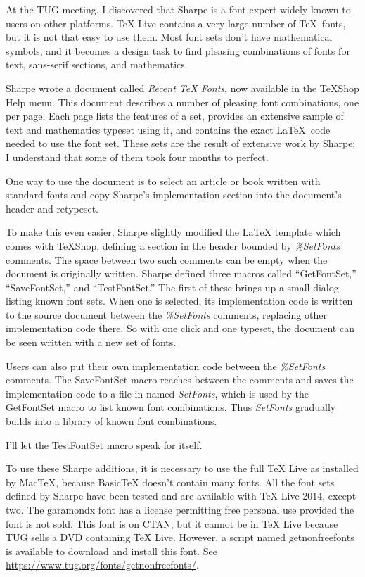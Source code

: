 \documentclass[11pt, oneside]{amsart}
\begin{document}
At the TUG meeting, I discovered that Sharpe is a font expert widely known to users on other platforms.
TeX Live contains a very large number of \TeX\ fonts, but it is not that easy to use them.
Most font sets don't have mathematical symbols, and it becomes a design task to find pleasing combinations of fonts for text, sans-serif sections, and mathematics.

Sharpe wrote a document called {\em Recent TeX Fonts}, now available in the TeXShop Help menu. This document describes a number of pleasing font combinations, one per page. Each page lists the features of a set, provides an extensive sample of text and mathematics typeset using
it, and contains the exact La\TeX\ code needed to use the font set. These sets are the result
of extensive work by Sharpe; I understand that some of them took four months to perfect.

One way to use the document is to select an article or book written with standard fonts and  copy Sharpe's implementation section into the document's header and retypeset. 

To make this even easier, Sharpe slightly modified the LaTeX template which comes with TeXShop, 
defining a  section in the header bounded by {\em \%SetFonts} comments. The space between two such comments can be empty when the document is originally written.  Sharpe defined three
macros called ``GetFontSet,'' ``SaveFontSet,'' and ``TestFontSet.'' The first of these brings up
a small dialog listing known font sets. When one is selected, its implementation code is written to the source document between the {\em \%SetFonts} comments, replacing other implementation code there. So with one click and one typeset, the document can be seen written with a new set of fonts.

Users can also put their own implementation code between the  {\em \%SetFonts} comments.
The SaveFontSet macro reaches between the comments and saves the implementation code to a file in  named {\em SetFonts}, which is used by the GetFontSet macro to list known font combinations. Thus {\em SetFonts}  gradually builds into a library of known font combinations.

I'll let the TestFontSet macro speak for itself.

To use these Sharpe additions, it is necessary to use the full TeX Live as installed by MacTeX,
because BasicTeX doesn't contain many fonts. All the font sets defined by Sharpe have been
tested and are available with TeX Live 2014, except two. The garamondx font has a license permitting free personal use provided the font is not sold. This font is on CTAN, but it cannot
be in TeX Live because TUG sells a DVD containing TeX Live. However, a script named getnonfreefonts is available to download and install this font. See \url{https://www.tug.org/fonts/getnonfreefonts/}.
\end{document}
